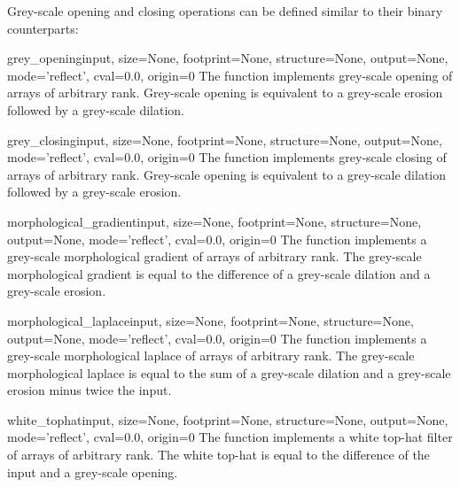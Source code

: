 Grey-scale opening and closing operations can be defined similar to their
binary counterparts:

\begin{funcdesc}{grey_opening}{input, size=None, footprint=None, 
    structure=None, output=None, mode='reflect', cval=0.0, origin=0} The
   function implements grey-scale opening of arrays 
  of arbitrary rank. Grey-scale opening is equivalent to a grey-scale 
  erosion followed by a grey-scale dilation.
\end{funcdesc}

\begin{funcdesc}{grey_closing}{input, size=None, footprint=None, 
    structure=None, output=None, mode='reflect', cval=0.0, origin=0} The
   function implements grey-scale closing of arrays 
  of arbitrary rank. Grey-scale opening is equivalent to a grey-scale 
  dilation followed by a grey-scale erosion.
\end{funcdesc}

\begin{funcdesc}{morphological_gradient}{input, size=None, footprint=None, 
    structure=None, output=None, mode='reflect', cval=0.0, origin=0} The
   function implements a grey-scale
  morphological gradient of arrays of arbitrary rank. The grey-scale
  morphological gradient is equal to the difference of a grey-scale 
  dilation and a grey-scale erosion.
\end{funcdesc}

\begin{funcdesc}{morphological_laplace}{input, size=None, footprint=None, 
    structure=None, output=None, mode='reflect', cval=0.0, origin=0} The
   function implements a grey-scale
  morphological laplace of arrays of arbitrary rank. The grey-scale
  morphological laplace is equal to the sum of a grey-scale dilation and a
  grey-scale erosion minus twice the input.
\end{funcdesc}

\begin{funcdesc}{white_tophat}{input, size=None, footprint=None, 
    structure=None, output=None, mode='reflect', cval=0.0, origin=0} The
   function implements a white top-hat filter of 
  arrays of arbitrary rank. The white top-hat is equal to the difference of 
  the input and a grey-scale opening.
\end{funcdesc}

